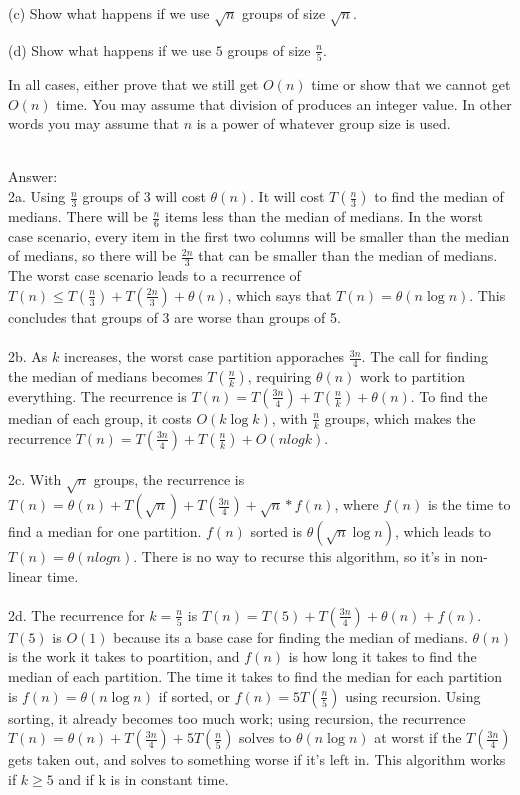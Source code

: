 \documentclass[12pt]{article}
\begin{document}
\begin{enumerate}
(c) Show what happens if we use $\sqrt{n}$ groups of size $\sqrt{n}$.   

(d) Show what happens if we use $5$ groups of size $\frac{n}{5}$. 

In all cases, either prove that we still get $O(n)$ time or show that we cannot get $O(n)$ time.  You may assume that division of produces an integer value. In other words you may assume that $n$ is a power of whatever group size is used.\\\\

{ \color{blue} Answer: \\

  2a. Using $\frac{n}{3}$ groups of 3 will cost $\theta(n)$. It will cost $T(\frac{n}{3})$ to find the median of medians. There will be $\frac{n}{6}$ items less than the median of medians. In the worst case scenario, every item in the first two columns will be smaller than the median of medians, so there will be $\frac{2n}{3}$ that can be smaller than the median of medians. The worst case scenario leads to a recurrence of $T(n) \leq T(\frac{n}{3}) + T(\frac{2n}{3}) + \theta(n)$, which says that $T(n) = \theta(n \log n)$. This concludes that groups of 3 are worse than groups of 5.\\ \\
  2b. As $k$ increases, the worst case partition apporaches $\frac{3n}{4}$. The call for finding the median of medians becomes $T(\frac{n}{k})$, requiring $\theta(n)$ work to partition everything. The recurrence is $T(n) = T(\frac{3n}{4}) + T(\frac{n}{k}) + \theta(n)$. To find the median of each group, it costs $O(k \log k)$, with $\frac{n}{k}$ groups, which makes the recurrence $T(n) = T(\frac{3n}{4}) + T(\frac{n}{k}) + O(n log k)$. \\ \\
  2c. With $\sqrt{n}$ groups, the recurrence is $T(n) = \theta(n) + T(\sqrt{n}) + T(\frac{3n}{4}) + \sqrt{n} * f(n)$, where $f(n)$ is the time to find a median for one partition. $f(n)$ sorted is $\theta(\sqrt{n} \log n)$, which leads to $T(n) = \theta(n log n)$. There is no way to recurse this algorithm, so it's in non-linear time. \\ \\
  2d. The recurrence for $k = \frac{n}{5}$ is $T(n) = T(5) + T(\frac{3n}{4}) + \theta(n) + f(n)$. $T(5)$ is $O(1)$ because its a base case for finding the median of medians. $\theta(n)$ is the work it takes to poartition, and $f(n)$ is how long it takes to find the median of each partition. The time it takes to find the median for each partition is $f(n) = \theta(n \log n)$ if sorted, or $f(n) = 5T(\frac{n}{5})$ using recursion. Using sorting, it already becomes too much work; using recursion, the recurrence $T(n) = \theta(n) + T(\frac{3n}{4}) + 5T(\frac{n}{5})$ solves to $\theta(n \log n)$ at worst if the $T(\frac{3n}{4})$ gets taken out, and solves to something worse if it's left in. This algorithm works if $k \geq 5$ and if k is in constant time.
  
}


\end{enumerate}
\end{document}
